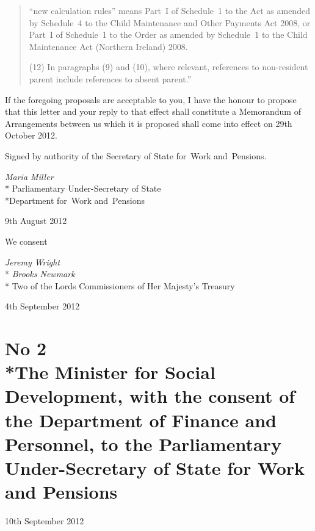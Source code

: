 \documentclass[12pt,a4paper]{article}
\begin{document}
\begin{enumerate}
\begin{quotation}
\begin{enumerate}
``new calculation rules'' means Part~I of Schedule~1 to the Act as amended by Schedule~4 to the Child Maintenance and Other Payments Act 2008, or Part~I of Schedule~1 to the Order as amended by Schedule~1 to the Child Maintenance Act (Northern Ireland) 2008.
\end{enumerate}

(12) In paragraphs (9) and (10), where relevant, references to non-resident parent include references to absent parent.''
\end{quotation}
\end{enumerate}

If the foregoing proposals are acceptable to you, I have the honour to propose that this letter and your reply to that effect shall constitute a Memorandum of Arrangements between us which it is proposed shall come into effect on 29th October 2012.

\bigskip

\pagebreak[3]

Signed 
by authority of the 
Secretary of State for~Work and~Pensions.

{\raggedleft
\emph{Maria Miller}\\*
Parliamentary Under-Secretary 
of State\\*Department 
for~Work and~Pensions

}

9th August 2012

\bigskip

\pagebreak[3]

We consent

{\raggedleft
\emph{Jeremy Wright}\\*
\emph{Brooks Newmark}\\*
Two of the Lords Commissioners of Her Majesty's Treasury

}

4th September 2012

\section*{No 2\\*The Minister for Social Development, with the consent of the Department of Finance and Personnel, to the Parliamentary Under-Secretary of State for Work and Pensions}

10th September 2012
\end{document}
